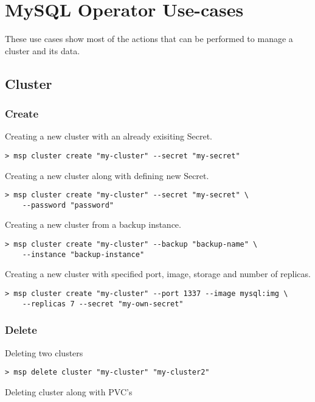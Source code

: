 \section{MySQL Operator Use-cases}
These use cases show most of the actions that can be performed to manage a cluster and its data.
\subsection{Cluster}

\subsubsection*{Create}
\noindent Creating a new cluster with an already exisiting Secret.

\begin{lstlisting}
> msp cluster create "my-cluster" --secret "my-secret"
\end{lstlisting}

\noindent Creating a new cluster along with defining new Secret.

\begin{lstlisting}
> msp cluster create "my-cluster" --secret "my-secret" \
	--password "password"
\end{lstlisting}

\noindent Creating a new cluster from a backup instance.

\begin{lstlisting}
> msp cluster create "my-cluster" --backup "backup-name" \
	--instance "backup-instance"
\end{lstlisting}

\noindent Creating a new cluster with specified port, image, storage and number of replicas.

\begin{lstlisting}
> msp cluster create "my-cluster" --port 1337 --image mysql:img \
	--replicas 7 --secret "my-own-secret"
\end{lstlisting}

\subsubsection*{Delete}
\noindent Deleting two clusters

\begin{lstlisting}
> msp delete cluster "my-cluster" "my-cluster2"
\end{lstlisting}

\noindent Deleting cluster along with PVC’s

